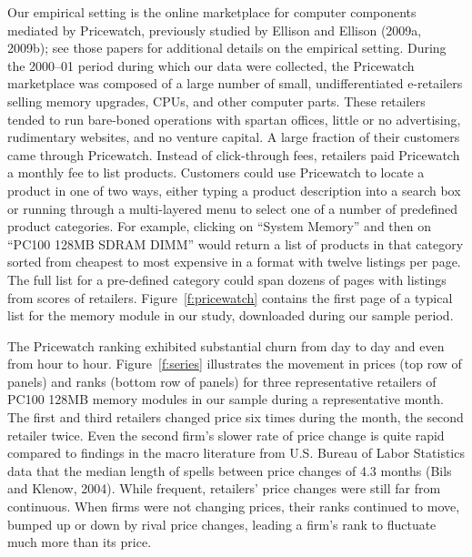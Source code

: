 \documentclass[11pt]{article}
\begin{document}
\begin{spacing}{1.3}
Our empirical setting is the online marketplace for computer
components mediated by Pricewatch, previously studied by Ellison and
Ellison (2009a, 2009b); see those papers for additional details on the
empirical setting. During the 2000--01 period during which our data
were collected, the Pricewatch marketplace was composed of a large
number of small, undifferentiated e-retailers selling memory upgrades,
CPUs, and other computer parts.  These retailers tended to run
bare-boned operations with spartan offices, little or no advertising,
rudimentary websites, and no venture capital. A large fraction of
their customers came through Pricewatch. Instead of click-through
fees, retailers paid Pricewatch a monthly fee to list
products. Customers could use Pricewatch to locate a product in one of
two ways, either typing a product description into a search box or
running through a multi-layered menu to select one of a number of
predefined product categories. For example, clicking on ``System
Memory'' and then on ``PC100 128MB SDRAM DIMM'' would return a list of
products in that category sorted from cheapest to most expensive in a
format with twelve listings per page. The full list for a pre-defined
category could span dozens of pages with listings from scores of
retailers. Figure~\ref{f:pricewatch} contains the first page of a
typical list for the memory module in our study, downloaded during our
sample period.

The Pricewatch ranking exhibited substantial churn from day to day and
even from hour to hour. Figure~\ref{f:series} illustrates the movement
in prices (top row of panels) and ranks (bottom row of panels) for
three representative retailers of PC100 128MB memory modules in our
sample during a representative month. The first and third retailers
changed price six times during the month, the second retailer
twice. Even the second firm's slower rate of price change is quite
rapid compared to findings in the macro literature from U.S. Bureau of
Labor Statistics data that the median length of spells between price
changes of 4.3 months (Bils and Klenow, 2004). While frequent,
retailers' price changes were still far from continuous. When firms
were not changing prices, their ranks continued to move, bumped up or
down by rival price changes, leading a firm's rank to fluctuate much
more than its price.


\end{spacing}
\end{document}
